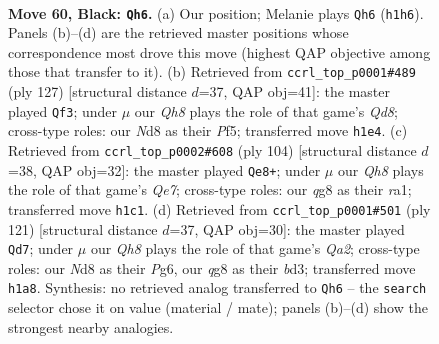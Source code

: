 \documentclass[11pt]{article}
\begin{document}
\clearpage

\begin{figure}[p]\centering
\begin{subfigure}{0.46\textwidth}\centering
\resizebox{\linewidth}{!}{%
\newchessgame
\chessboard[
  setfen={2kn2Q1/p1p3p1/1p4p1/2p5/8/2P5/KP6/7q b - - 21 60},
  showmover=false,
  pgfstyle=straightmove, color=movearrow, markmove={h1-h6}
]}
\caption{}
\end{subfigure}\hfill
\begin{subfigure}{0.46\textwidth}\centering
\resizebox{\linewidth}{!}{%
\newchessgame
\chessboard[
  setfen={8/7p/6pk/3PQp2/4p3/6P1/5P1K/3q4 b - - 8 64},
  showmover=false,
  pgfstyle=straightmove, color=movearrow, markmove={d1-f3}
]}
\caption{}
\end{subfigure}
\\[4pt]
\begin{subfigure}{0.46\textwidth}\centering
\resizebox{\linewidth}{!}{%
\newchessgame
\chessboard[
  setfen={6k1/4Q3/8/1p2P2p/2p5/2P4q/1P3P2/r4NK1 w - - 16 53},
  showmover=false,
  pgfstyle=straightmove, color=movearrow, markmove={e7-e8}
]}
\caption{}
\end{subfigure}\hfill
\begin{subfigure}{0.46\textwidth}\centering
\resizebox{\linewidth}{!}{%
\newchessgame
\chessboard[
  setfen={5Q2/q4p1k/4p1p1/4P2p/8/1p1B1KP1/7P/8 b - - 7 61},
  showmover=false,
  pgfstyle=straightmove, color=movearrow, markmove={a7-d7}
]}
\caption{}
\end{subfigure}
\caption{\textbf{Move 60, Black: \texttt{Qh6}.} (a) Our position; Melanie plays \texttt{Qh6} (\texttt{h1h6}). Panels (b)--(d) are the retrieved master positions whose correspondence most drove this move (highest QAP objective among those that transfer to it). (b) Retrieved from \texttt{ccrl\_top\_p0001\#489} (ply 127) [structural distance $d$=37, QAP obj=41]: the master played \texttt{Qf3}; under $\mu$ our \emph{Qh8} plays the role of that game's \emph{Qd8}; cross-type roles: our \emph{N}d8 as their \emph{P}f5; transferred move \texttt{h1e4}. (c) Retrieved from \texttt{ccrl\_top\_p0002\#608} (ply 104) [structural distance $d$=38, QAP obj=32]: the master played \texttt{Qe8+}; under $\mu$ our \emph{Qh8} plays the role of that game's \emph{Qe7}; cross-type roles: our \emph{q}g8 as their \emph{r}a1; transferred move \texttt{h1c1}. (d) Retrieved from \texttt{ccrl\_top\_p0001\#501} (ply 121) [structural distance $d$=37, QAP obj=30]: the master played \texttt{Qd7}; under $\mu$ our \emph{Qh8} plays the role of that game's \emph{Qa2}; cross-type roles: our \emph{N}d8 as their \emph{P}g6, our \emph{q}g8 as their \emph{b}d3; transferred move \texttt{h1a8}. Synthesis: no retrieved analog transferred to \texttt{Qh6} -- the \texttt{search} selector chose it on value (material / mate); panels (b)--(d) show the strongest nearby analogies.}
\label{fig:thought-m119}
\end{figure}
\end{document}
